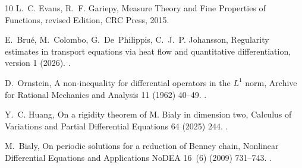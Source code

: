 \documentclass[review,12pt,times,a4paper,nopreprintline]{elsarticle}
\theoremstyle{plain}
\theoremstyle{definition}
\theoremstyle{remark}
\numberwithin{equation}{section}
\begin{document}
\begin{thebibliography}{10}
L.~C. Evans, R.~F. Gariepy, Measure Theory and Fine Properties of Functions,
  revised Edition, CRC Press, 2015.

E.~Bru{\'e}, M.~Colombo, G.~De~Philippis, C.~J.~P. Johansson, Regularity
  estimates in transport equations via heat flow and quantitative
  differentiation, version 1 (2026).
\newblock \href {https://arxiv.org/abs/2607.13751v1}
  {}.

D.~Ornstein, A non-inequality for differential operators in the {$L^1$} norm,
  Archive for Rational Mechanics and Analysis 11 (1962) 40--49.
\newblock \href {https://doi.org/10.1007/BF00253928}
  {}.

Y.~C. Huang, On a rigidity theorem of {M. Bialy} in dimension two, Calculus of
  Variations and Partial Differential Equations 64 (2025) 244.
\newblock \href {https://doi.org/10.1007/s00526-025-03130-2}
  {}.

M.~Bialy, On periodic solutions for a reduction of {Benney} chain, Nonlinear
  Differential Equations and Applications NoDEA 16~(6) (2009) 731--743.
\newblock \href {https://doi.org/10.1007/s00030-009-0032-y}
  {}.

\end{thebibliography}
\endgroup
\end{document}
